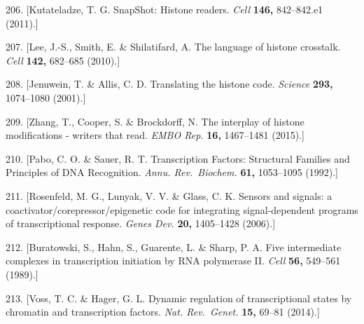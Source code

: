 \documentclass[11pt,twoside]{MPIthesis}
\theoremstyle{definition}
\theoremstyle{definition}
\theoremstyle{definition}
\theoremstyle{remark}
\begin{document}
206. {[}Kutateladze, T. G. SnapShot: Histone readers. \emph{Cell}
\textbf{146,} 842--842.e1 (2011).{]}

207. {[}Lee, J.-S., Smith, E. \& Shilatifard, A. The language of histone
crosstalk. \emph{Cell} \textbf{142,} 682--685 (2010).{]}

208. {[}Jenuwein, T. \& Allis, C. D. Translating the histone code.
\emph{Science} \textbf{293,} 1074--1080 (2001).{]}

209. {[}Zhang, T., Cooper, S. \& Brockdorff, N. The interplay of histone
modifications - writers that read. \emph{EMBO Rep.} \textbf{16,}
1467--1481 (2015).{]}

210. {[}Pabo, C. O. \& Sauer, R. T. Transcription Factors: Structural
Families and Principles of DNA Recognition. \emph{Annu. Rev.~Biochem.}
\textbf{61,} 1053--1095 (1992).{]}

211. {[}Rosenfeld, M. G., Lunyak, V. V. \& Glass, C. K. Sensors and
signals: a coactivator/corepressor/epigenetic code for integrating
signal-dependent programs of transcriptional response. \emph{Genes Dev.}
\textbf{20,} 1405--1428 (2006).{]}

212. {[}Buratowski, S., Hahn, S., Guarente, L. \& Sharp, P. A. Five
intermediate complexes in transcription initiation by RNA polymerase II.
\emph{Cell} \textbf{56,} 549--561 (1989).{]}

213. {[}Voss, T. C. \& Hager, G. L. Dynamic regulation of
transcriptional states by chromatin and transcription factors.
\emph{Nat. Rev.~Genet.} \textbf{15,} 69--81 (2014).{]}


\end{document}
